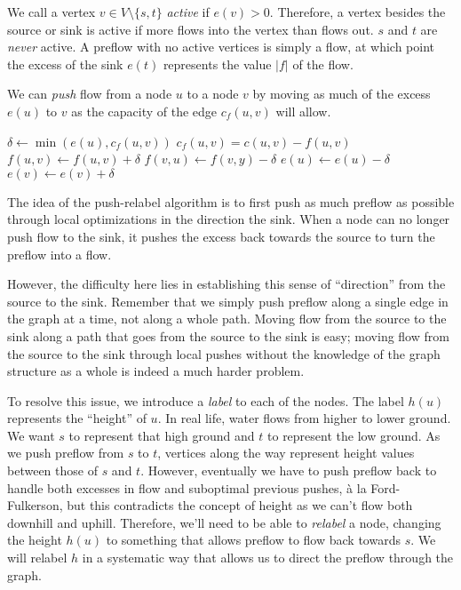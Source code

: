 We call a vertex $v \in V \setminus \{s, t\}$ \textit{active} if $e(v) > 0$. Therefore, a vertex besides the source or sink is active if more flows into the vertex than flows out. $s$ and $t$ are \textit{never} active. A preflow with no active vertices is simply a flow, at which point the excess of the sink $e(t)$ represents the value $|f|$ of the flow.

We can \textit{push} flow from a node $u$ to a node $v$ by moving as much of the excess $e(u)$ to $v$ as the capacity of the edge $c_f(u,v)$ will allow.

\noindent \begin{minipage}{\textwidth}
\begin{algorithmic}
	\State $\delta \gets \min(e(u), c_f(u,v))$
	\Comment $c_f(u,v) = c(u,v) - f(u,v)$
	\State $f(u,v) \gets f(u,v) + \delta$
	\State $f(v,u) \gets f(v,y) - \delta$
	\State $e(u) \gets e(u) - \delta$
	\State $e(v) \gets e(v) + \delta$
\EndFunction
\end{algorithmic}
\end{minipage}

The idea of the push-relabel algorithm is to first push as much preflow as possible through local optimizations in the direction the sink. When a node can no longer push flow to the sink, it pushes the excess back towards the source to turn the preflow into a flow.

However, the difficulty here lies in establishing this sense of ``direction'' from the source to the sink. Remember that we simply push preflow along a single edge in the graph at a time, not along a whole path. Moving flow from the source to the sink along a path that goes from the source to the sink is easy; moving flow from the source to the sink through local pushes without the knowledge of the graph structure as a whole is indeed a much harder problem.

To resolve this issue, we introduce a \textit{label} to each of the nodes. The label $h(u)$ represents the ``height'' of $u$. In real life, water flows from higher to lower ground. We want $s$ to represent that high ground and $t$ to represent the low ground. As we push preflow from $s$ to $t$, vertices along the way represent height values between those of $s$ and $t$. However, eventually we have to push preflow back to handle both excesses in flow and suboptimal previous pushes, \`{a} la Ford-Fulkerson, but this contradicts the concept of height as we can't flow both downhill and uphill. Therefore, we'll need to be able to \textit{relabel} a node, changing the height $h(u)$ to something that allows preflow to flow back towards $s$. We will relabel $h$ in a systematic way that allows us to direct the preflow through the graph.

